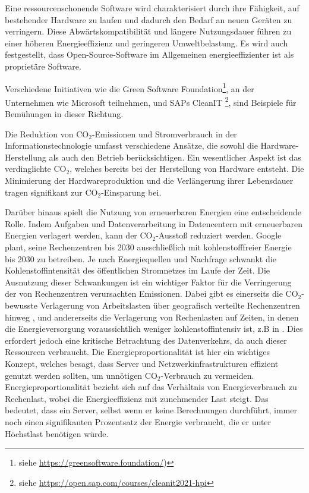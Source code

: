 \documentclass{article}
\begin{document}
Eine ressourcenschonende Software wird charakterisiert durch ihre Fähigkeit, auf bestehender Hardware zu laufen und dadurch den Bedarf an neuen Geräten zu verringern. Diese Abwärtskompatibilität und längere Nutzungsdauer führen zu einer höheren Energieeffizienz und geringeren Umweltbelastung. Es wird auch festgestellt, dass Open-Source-Software im Allgemeinen energieeffizienter ist als proprietäre Software.

Verschiedene Initiativen wie die Green Software Foundation\footnote{%
             siehe \href{https://greensoftware.foundation/}{https://greensoftware.foundation/})},%
an der Unternehmen wie Microsoft teilnehmen, und SAPs CleanIT \footnote{%
       siehe \href{https://open.sap.com/courses/cleanit2021-hpi}{https://open.sap.com/courses/cleanit2021-hpi}}, %
sind Beispiele für Bemühungen in dieser Richtung. 

Die Reduktion von CO$_2$-Emissionen und Stromverbrauch in der Informationstechnologie umfasst verschiedene Ansätze, die sowohl die Hardware-Herstellung als auch den Betrieb berücksichtigen. Ein wesentlicher Aspekt ist das verdinglichte CO$_2$, welches bereits bei der Herstellung von Hardware entsteht. Die Minimierung der Hardwareproduktion und die Verlängerung ihrer Lebensdauer tragen signifikant zur CO$_2$-Einsparung bei.

Darüber hinaus spielt die Nutzung von erneuerbaren Energien eine entscheidende Rolle. Indem Aufgaben und Datenverarbeitung in Datencentern mit erneuerbaren Energien verlagert werden, kann der CO$_2$-Ausstoß reduziert werden. Google plant, seine Rechenzentren bis 2030 ausschließlich mit kohlenstofffreier
Energie bis 2030 zu betreiben\cite{Google_2020}. 
Je nach Energiequellen und Nachfrage schwankt die Kohlenstoffintensität des öffentlichen Stromnetzes im Laufe der Zeit. Die Ausnutzung dieser Schwankungen ist ein wichtiger Faktor für die Verringerung der von Rechenzentren verursachten Emissionen. Dabei gibt es einerseits  die CO$_2$-bewusste Verlagerung von Arbeitslasten über geografisch verteilte Rechenzentren hinweg \cite{yang_carbon-neutralized_2022}, und andererseits  die  Verlagerung von Rechenlasten auf Zeiten, in denen die Energieversorgung voraussichtlich weniger kohlenstoffintensiv ist, z.B in  \cite{wiesner_lets_2021}.
Dies erfordert jedoch eine kritische Betrachtung des Datenverkehrs, da auch dieser Ressourcen verbraucht. Die Energieproportionalität \cite{abts_energy_2010, zheng_distributed_2022} ist hier ein wichtiges Konzept, welches besagt, dass Server und Netzwerkinfrastrukturen effizient genutzt werden sollten, um unnötigen CO$_2$-Verbrauch zu vermeiden. 
Energieproportionalität bezieht sich auf das Verhältnis von Energieverbrauch zu Rechenlast, wobei die Energieeffizienz mit zunehmender Last steigt. Das bedeutet, dass ein Server, selbst wenn er keine Berechnungen durchführt, immer noch einen signifikanten Prozentsatz der Energie verbraucht, die er unter Höchstlast benötigen würde.
\end{document}
